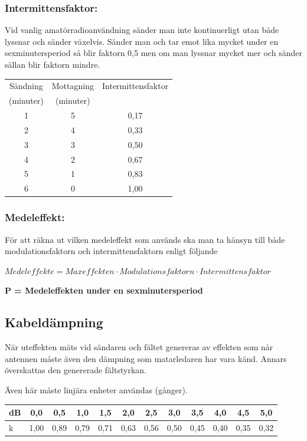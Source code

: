 \subsubsection{Intermittensfaktor:}

Vid vanlig amatörradioanvändning sänder man inte kontinuerligt utan
både lyssnar och sänder växelvis. Sänder man och tar emot lika mycket
under en sexminutersperiod så blir faktorn 0,5 men om man lyssnar
mycket mer och sänder sällan blir faktorn mindre.

\begin{tabular}{|c|c|c|}
\hline
Sändning  & Mottagning & Intermittensfaktor \\
(minuter) & (minuter)  & \\ \hline
1 & 5 & 0,17 \\ \hline
2 & 4 & 0,33 \\ \hline
3 & 3 & 0,50 \\ \hline
4 & 2 & 0,67 \\ \hline
5 & 1 & 0,83 \\ \hline
6 & 0 & 1,00 \\ \hline
\end{tabular}

\subsubsection{Medeleffekt:}

För att räkna ut vilken medeleffekt som används ska man ta hänsyn
till både modulationsfaktorn och intermittensfaktorn enligt följande

\(Medeleffekte = Maxeffekten \cdot Modulationsfaktorn \cdot Intermittensfaktor\)

\textbf{P = Medeleffekten under en sexminutersperiod}

\subsection{Kabeldämpning}

När uteffekten mäts vid sändaren och fältet genereras av effekten som
når antennen måste även den dämpning som matarledaren har vara känd.
Annars överskattas den genererade fältstyrkan.

Även här måste linjära enheter användas (gånger).

\begin{tabular}{|l|c|c|c|c|c|c|c|c|c|c|c|}
\hline
dB & 0,0  & 0,5  & 1,0  & 1,5  & 2,0  & 2,5  & 3,0  & 3,5  & 4,0  & 4,5  & 5,0 \\ \hline
k  & 1,00 & 0,89 & 0,79 & 0,71 & 0,63 & 0,56 & 0,50 & 0,45 & 0,40 & 0,35 & 0,32 \\ \hline
\end{tabular}

